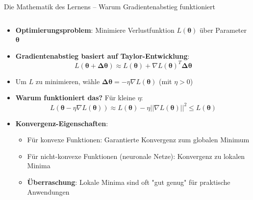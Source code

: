 \documentclass[aspectratio=1610, xcolor=dvipsnames, 9pt]{beamer}
\begin{document}
\begin{frame}{Die Mathematik des Lernens -- Warum Gradientenabstieg funktioniert}
  \begin{columns}
    \begin{column}{1\textwidth}
      \begin{itemize}
        \item \textbf{Optimierungsproblem}: Minimiere Verlustfunktion $L(\boldsymbol{\theta})$ über Parameter $\boldsymbol{\theta}$
        \item \textbf{Gradientenabstieg basiert auf Taylor-Entwicklung}:
        \begin{equation}
          L(\boldsymbol{\theta} + \boldsymbol{\Delta\theta}) \approx L(\boldsymbol{\theta}) + \nabla L(\boldsymbol{\theta})^T \boldsymbol{\Delta\theta}
        \end{equation}
        \item Um $L$ zu minimieren, wähle $\boldsymbol{\Delta\theta} = -\eta \nabla L(\boldsymbol{\theta})$ (mit $\eta > 0$)
        \item \textbf{Warum funktioniert das?} Für kleine $\eta$:
        \begin{equation}
          L(\boldsymbol{\theta} - \eta \nabla L(\boldsymbol{\theta})) \approx L(\boldsymbol{\theta}) - \eta ||\nabla L(\boldsymbol{\theta})||^2 \leq L(\boldsymbol{\theta})
        \end{equation}
        \item \textbf{Konvergenz-Eigenschaften}:
        \begin{itemize}
          \item Für konvexe Funktionen: Garantierte Konvergenz zum globalen Minimum
          \item Für nicht-konvexe Funktionen (neuronale Netze): Konvergenz zu lokalen Minima
          \item \textbf{Überraschung}: Lokale Minima sind oft "gut genug" für praktische Anwendungen
        \end{itemize}
      \end{itemize}
    \end{column}
  \end{columns}
\end{frame}
\end{document}
